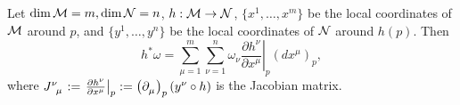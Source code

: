 \documentclass[../main.tex]{subfiles}
\begin{document}
    \begin{theorem}\label{thm:pullback-local-representative}
        Let \(\dim \manifold[M]=m, \dim \manifold[N]=n\), \(h : \manifold[M] 
        \to \manifold[N]\), \(\{x^1, \dots, x^m\}\) be the local coordinates of 
        \(\manifold[M]\) around \(p\), and \(\{y^1, \dots, y^n\}\) be the local 
        coordinates of \(\manifold[N]\) around \(h(p)\). Then 
        \[
        h^*\omega = \sum_{\mu=1}^{m} \sum_{\nu=1}^{n} \omega_\nu
        \left.\frac{\partial h^\nu}{\partial x^\mu}\right|_{p}(dx^\mu)_p,
        \]
        where \(J\indices{^\nu_\mu}:=\left.\frac{\partial h^\nu}{\partial x^\mu}\right|_{p}
        :=\tvec{\mu}{p}(y^\nu\circ h)\) is the Jacobian matrix.
    \end{theorem}
\end{document}
